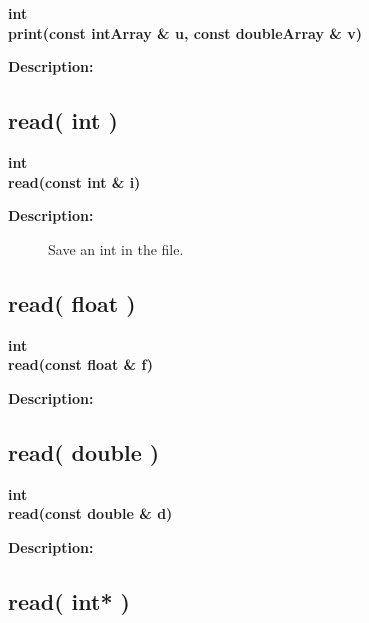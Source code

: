 \begin{flushleft} \textbf{%
int  \\ 
\settowidth{\FortranIOIncludeArgIndent}{print(}%
print(const intArray \& u, const doubleArray \& v)
}\end{flushleft}
\begin{description}
\item[{\bf Description:}] 
\end{description}
\subsection{read( int )}
 
\begin{flushleft} \textbf{%
int  \\ 
\settowidth{\FortranIOIncludeArgIndent}{read(}%
read(const int \& i)
}\end{flushleft}
\begin{description}
\item[{\bf Description:}] 
   Save an int in the file.
\end{description}
\subsection{read( float )}
 
\begin{flushleft} \textbf{%
int  \\ 
\settowidth{\FortranIOIncludeArgIndent}{read(}%
read(const float \& f)
}\end{flushleft}
\begin{description}
\item[{\bf Description:}] 
\end{description}
\subsection{read( double )}
 
\begin{flushleft} \textbf{%
int  \\ 
\settowidth{\FortranIOIncludeArgIndent}{read(}%
read(const double \& d)
}\end{flushleft}
\begin{description}
\item[{\bf Description:}] 
\end{description}
\subsection{read( int* )}
 
